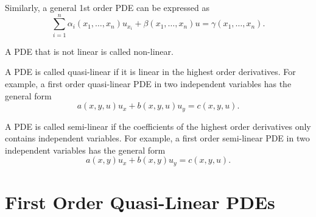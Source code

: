 \documentclass[11pt]{penrose}
\begin{document}
Similarly, a general 1st order PDE can be expressed as
\begin{equation*}
    \sum_{i=1}^{n} \alpha_i (x_1, \dots, x_n) u_{x_i} + \beta (x_1, \dots, x_n) u = \gamma (x_1, \dots, x_n).
\end{equation*}

A PDE that is not linear is called non-linear.

A PDE is called quasi-linear if it is linear in the highest order derivatives. For example, a first order quasi-linear PDE in two independent variables has the general form
\begin{equation}
    a(x,y,u) u_x + b(x,y,u) u_y = c(x,y,u).
\end{equation}

A PDE is called semi-linear if the coefficients of the highest order derivatives only contains independent variables. For example, a first order semi-linear PDE in two independent variables has the general form
\begin{equation}
    a(x,y) u_x + b(x,y) u_y = c(x,y,u).
\end{equation}

\section{First Order Quasi-Linear PDEs}
\end{document}
